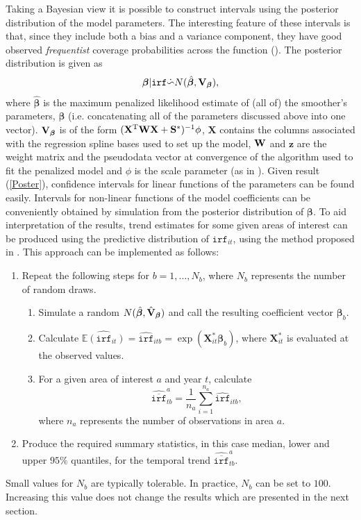Taking a Bayesian view it is possible to construct intervals using the posterior distribution of the model parameters. The interesting feature of these intervals is that, since they include both a bias and a variance component, they have good observed \textit{frequentist} coverage probabilities across the function (\cite{Marra2011}). The posterior distribution is given as
\begin{equation}
\bm\beta|\texttt{irf} \dot{\backsim} N( \hat{\bm\beta}, {\bf V}_{\bm\beta} ),
\label{Poster}
\end{equation}
where $\hat{\bm\beta}$ is the maximum penalized likelihood estimate of (all of) the smoother's parameters, $\bm\beta$ (i.e. concatenating all of the parameters discussed above into one vector). ${\bf V}_{\bm\beta}$ is of the form $(\mathbf{X}^\text{T}{\bf W}\mathbf{X}+{\bf S}^*)^{-1}\phi$, $\mathbf{X}$ contains the columns associated with the regression spline bases used to set up the model, ${\bf W}$ and $\mathbf{z}$ are the weight matrix and the pseudodata vector at convergence of the algorithm used to fit the penalized model and $\phi$ is the scale parameter (as in ). Given result (\ref{Poster}), confidence intervals for linear functions of the parameters can be found easily. Intervals for non-linear functions of the model coefficients can be conveniently obtained by simulation from the posterior distribution of $\bm\beta$. To aid interpretation of the results, trend estimates for some given areas of interest can be produced using the predictive distribution of $\texttt{irf}_{it}$, using the method proposed in . This approach can be implemented as follows:

\begin{enumerate}
	\item Repeat the following steps for $b=1,\ldots,N_b$, where $N_b$ represents the number of random draws. 
	   \begin{enumerate}
	      \item Simulate a random $N(\hat{\bm\beta}, \hat{{\bf V}}_{\bm\beta} )$ and call the resulting coefficient vector $\bm\beta_b$.
	      \item Calculate $\widehat{\mathbb{E}(\texttt{irf}_{it})}=\widehat{\texttt{irf}}_{itb}=\exp(\mathbf{X}^*_{it}\bm\beta_b)$, where $\mathbf{X}^*_{it}$ is evaluated at the observed values. 
	      \item For a given area of interest $a$ and year $t$, calculate
	      $$\widehat{\overline{\texttt{irf}}}_{tb}^a=\frac{1}{n_a}\sum_{i=1}^{n_a} \widehat{\texttt{irf}}_{itb},$$
	      where $n_a$ represents the number of observations in area $a$.     
	   \end{enumerate}
	\item Produce the required summary statistics, in this case median, lower and upper $95\%$ quantiles, for the temporal trend $\widehat{\overline{\texttt{irf}}}_{tb}^a$.
\end{enumerate}
Small values for $N_b$ are typically tolerable. In practice, $N_b$ can be set to $100$. Increasing this value does not change the results which are presented in the next section.
 

